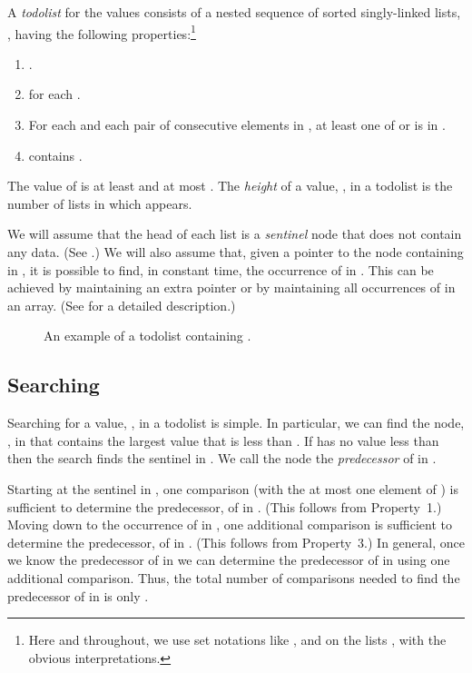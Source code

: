 \documentclass{patmorin}
\begin{document}
A \emph{todolist} for the values  consists of a
nested sequence of  sorted singly-linked lists, ,
having the following properties:\footnote{Here and throughout, we use set
notations like , and  on the lists ,
with the obvious interpretations.}

\begin{enumerate}
  \item .
  \item  for each .
  \item For each  and each pair  of consecutive
        elements in , at least one of  or  is in .
  \item  contains .
\end{enumerate}

The value of  is at least  and
at most .  The \emph{height} of
a value, , in a todolist is the number of lists in which  appears.

We will assume that the head of each list  is a \emph{sentinel} node that does not contain any data. (See .)  We will also
assume that, given a pointer to the node containing  in , it is
possible to find, in constant time, the occurrence of  in .
This can be achieved by maintaining an extra pointer or by maintaining
all occurrences of  in an array. (See  for
a detailed description.)

\begin{figure}
  \caption{An example of a todolist containing .}
\end{figure}




\subsection{Searching}

Searching for a value, , in a todolist is simple. In particular, we
can find the node, , in  that contains the largest value that
is less than . If  has no value less than  then the search
finds the sentinel in .  We call the node  the \emph{predecessor}
of  in .

Starting at the sentinel in , one comparison (with the at most one
element of ) is sufficient to determine the predecessor,  of 
in . (This follows from Property~1.)  Moving down to the occurrence
of  in , one additional comparison is sufficient to determine
the predecessor,  of  in . (This follows from Property~3.)
In general, once we know the predecessor of  in  we can determine
the predecessor of  in  using one additional comparison. Thus,
the total number of comparisons needed to find the predecessor of 
in  is only .
\end{document}
